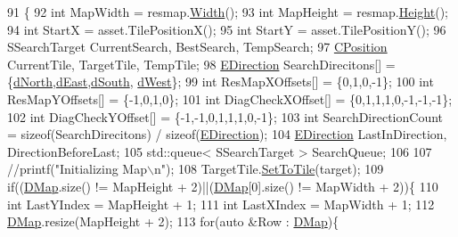 \begin{DoxyCode}
91                                                                                                            
               \{
92     \textcolor{keywordtype}{int} MapWidth = resmap.\hyperlink{classCTerrainMap_a34cb754aa9b26e85a73377159f2527d7}{Width}();
93     \textcolor{keywordtype}{int} MapHeight = resmap.\hyperlink{classCTerrainMap_ae5e4bf6507e0e3e9ac0322b43eed8a7a}{Height}();
94     \textcolor{keywordtype}{int} StartX = asset.TilePositionX();
95     \textcolor{keywordtype}{int} StartY = asset.TilePositionY();
96     SSearchTarget CurrentSearch, BestSearch, TempSearch;
97     \hyperlink{classCPosition}{CPosition} CurrentTile, TargetTile, TempTile;
98     \hyperlink{GameDataTypes_8h_acb2b033915f6659a71a38b5aa6e4eb42}{EDirection} SearchDirecitons[] = \{\hyperlink{GameDataTypes_8h_acb2b033915f6659a71a38b5aa6e4eb42a74d0139aee571cee88ff1393bbc6999e}{dNorth},\hyperlink{GameDataTypes_8h_acb2b033915f6659a71a38b5aa6e4eb42a06b098879996cb811972f1fb43f11e55}{dEast},\hyperlink{GameDataTypes_8h_acb2b033915f6659a71a38b5aa6e4eb42ab97d9c3d0f527d3f74de60cc1889ecd0}{dSouth},
      \hyperlink{GameDataTypes_8h_acb2b033915f6659a71a38b5aa6e4eb42a3006340383b02f53e16c07e89b1163b0}{dWest}\};
99     \textcolor{keywordtype}{int} ResMapXOffsets[] = \{0,1,0,-1\};
100     \textcolor{keywordtype}{int} ResMapYOffsets[] = \{-1,0,1,0\};
101     \textcolor{keywordtype}{int} DiagCheckXOffset[] = \{0,1,1,1,0,-1,-1,-1\};
102     \textcolor{keywordtype}{int} DiagCheckYOffset[] = \{-1,-1,0,1,1,1,0,-1\};
103     \textcolor{keywordtype}{int} SearchDirectionCount = \textcolor{keyword}{sizeof}(SearchDirecitons) / \textcolor{keyword}{sizeof}(\hyperlink{GameDataTypes_8h_acb2b033915f6659a71a38b5aa6e4eb42}{EDirection});
104     \hyperlink{GameDataTypes_8h_acb2b033915f6659a71a38b5aa6e4eb42}{EDirection} LastInDirection, DirectionBeforeLast;
105     std::queue< SSearchTarget > SearchQueue;
106     
107     \textcolor{comment}{//printf("Initializing Map\(\backslash\)n");}
108     TargetTile.\hyperlink{classCPosition_ae302aa21792de64c97de29e2cbbfeb94}{SetToTile}(target);
109     \textcolor{keywordflow}{if}((\hyperlink{classCRouterMap_a313fe70c998e9e3f22753d47075af1a6}{DMap}.size() != MapHeight + 2)||(\hyperlink{classCRouterMap_a313fe70c998e9e3f22753d47075af1a6}{DMap}[0].size() != MapWidth + 2))\{
110         \textcolor{keywordtype}{int} LastYIndex = MapHeight + 1;
111         \textcolor{keywordtype}{int} LastXIndex = MapWidth + 1;
112         \hyperlink{classCRouterMap_a313fe70c998e9e3f22753d47075af1a6}{DMap}.resize(MapHeight + 2);
113         \textcolor{keywordflow}{for}(\textcolor{keyword}{auto} &Row : \hyperlink{classCRouterMap_a313fe70c998e9e3f22753d47075af1a6}{DMap})\{

\end{DoxyCode}
